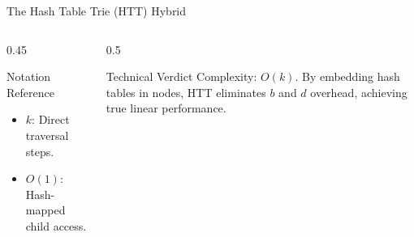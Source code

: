 \begin{frame}[t]{The Hash Table Trie (HTT) Hybrid}
    \begin{columns}[T]
        \begin{column}{0.45\textwidth}
            \begin{alertblock}{Notation Reference}
                \scriptsize
                \begin{itemize}
                    \item \textbf{$k$}: Direct traversal steps.
                    \item \textbf{$O(1)$}: Hash-mapped child access.
                \end{itemize}
            \end{alertblock}
        \end{column}
        \begin{column}{0.5\textwidth}
            \begin{alertblock}{Technical Verdict}
                \scriptsize
                Complexity: \textbf{$O(k)$}. By embedding hash tables in nodes, HTT eliminates $b$ and $d$ overhead, achieving true linear performance.
            \end{alertblock}
        \end{column}
    \end{columns}
\end{frame}
